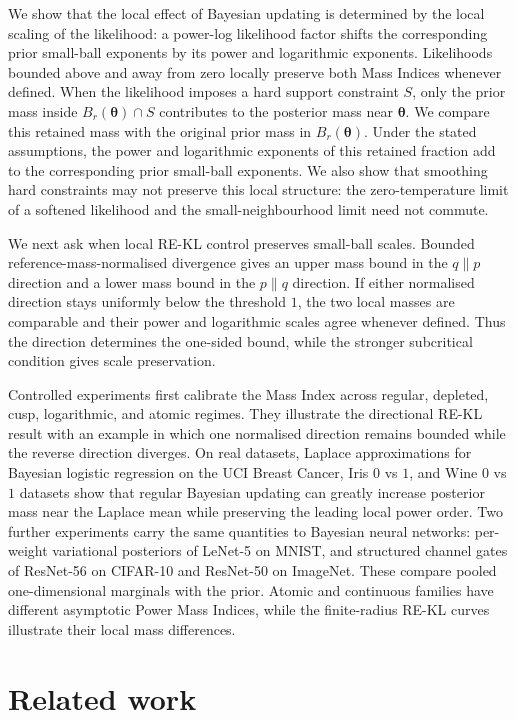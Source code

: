 \documentclass[11pt,a4paper]{article}
\newcommand{\pa}{\boldsymbol\theta}
\theoremstyle{compactplain}
\theoremstyle{compactdefinition}
\numberwithin{equation}{section}
\begin{document}
We show that the local effect of Bayesian updating is determined by the local scaling of the likelihood: a power-log likelihood factor shifts the corresponding prior small-ball exponents by its power and logarithmic exponents. Likelihoods bounded above and away from zero locally preserve both Mass Indices whenever defined.
When the likelihood imposes a hard support constraint \(S\), only the prior mass inside \(B_r(\pa)\cap S\) contributes to the posterior mass near \(\pa\). We compare this retained mass with the original prior mass in \(B_r(\pa)\). Under the stated assumptions, the power and logarithmic exponents of this retained fraction add to the corresponding prior small-ball exponents. We also show that smoothing hard constraints may not preserve this local structure: the zero-temperature limit of a softened likelihood and the small-neighbourhood limit need not commute.

We next ask when local RE-KL control preserves small-ball scales. Bounded reference-mass-normalised divergence gives an upper mass bound in the \(q\|p\) direction and a lower mass bound in the \(p\|q\) direction. If either normalised direction stays uniformly below the threshold \(1\), the two local masses are comparable and their power and logarithmic scales agree whenever defined. Thus the direction determines the one-sided bound, while the stronger subcritical condition gives scale preservation.

Controlled experiments first calibrate the Mass Index across regular, depleted, cusp, logarithmic, and atomic regimes. They illustrate the directional RE-KL result with an example in which one normalised direction remains bounded while the reverse direction diverges. On real datasets, Laplace approximations for Bayesian logistic regression on the UCI Breast Cancer, Iris \(0\) vs \(1\), and Wine \(0\) vs \(1\) datasets show that regular Bayesian updating can greatly increase posterior mass near the Laplace mean while preserving the leading local power order. Two further experiments carry the same quantities to Bayesian neural networks: per-weight variational posteriors of LeNet-5 on MNIST, and structured channel gates of ResNet-56 on CIFAR-10 and ResNet-50 on ImageNet. These compare pooled one-dimensional marginals with the prior. Atomic and continuous families have different asymptotic Power Mass Indices, while the finite-radius RE-KL curves illustrate their local mass differences.

\section{Related work}
\end{document}
